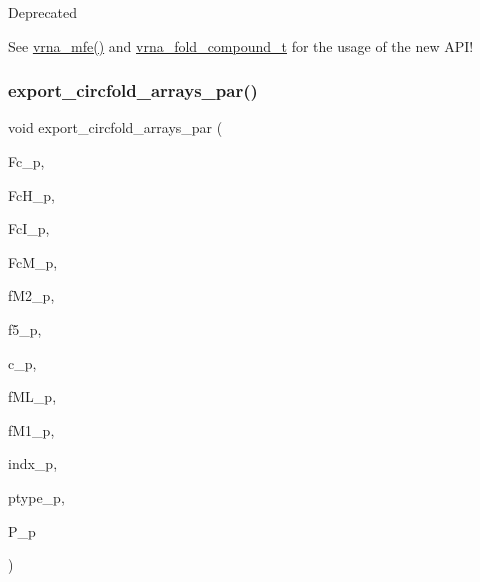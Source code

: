 \begin{DoxyRefDesc}{Deprecated}
\item[\mbox{\hyperlink{deprecated__deprecated000078}{Deprecated}}]See \mbox{\hyperlink{group__mfe__fold_gabd3b147371ccf25c577f88bbbaf159fd}{vrna\+\_\+mfe()}} and \mbox{\hyperlink{group__fold__compound_ga1b0cef17fd40466cef5968eaeeff6166}{vrna\+\_\+fold\+\_\+compound\+\_\+t}} for the usage of the new A\+P\+I!\end{DoxyRefDesc}
\mbox{\label{group__mfe__fold__single_ga004bb901e7fd2f8d5ae68f9530318ce1}} 
\subsubsection{\texorpdfstring{export\+\_\+circfold\+\_\+arrays\+\_\+par()}{export\_circfold\_arrays\_par()}}
{\footnotesize\ttfamily void export\+\_\+circfold\+\_\+arrays\+\_\+par (\begin{DoxyParamCaption}\item[{int $\ast$}]{Fc\+\_\+p,  }\item[{int $\ast$}]{Fc\+H\+\_\+p,  }\item[{int $\ast$}]{Fc\+I\+\_\+p,  }\item[{int $\ast$}]{Fc\+M\+\_\+p,  }\item[{int $\ast$$\ast$}]{f\+M2\+\_\+p,  }\item[{int $\ast$$\ast$}]{f5\+\_\+p,  }\item[{int $\ast$$\ast$}]{c\+\_\+p,  }\item[{int $\ast$$\ast$}]{f\+M\+L\+\_\+p,  }\item[{int $\ast$$\ast$}]{f\+M1\+\_\+p,  }\item[{int $\ast$$\ast$}]{indx\+\_\+p,  }\item[{char $\ast$$\ast$}]{ptype\+\_\+p,  }\item[{\mbox{\hyperlink{group__energy__parameters_ga8a69ca7d787e4fd6079914f5343a1f35}{vrna\+\_\+param\+\_\+t}} $\ast$$\ast$}]{P\+\_\+p }\end{DoxyParamCaption})}



